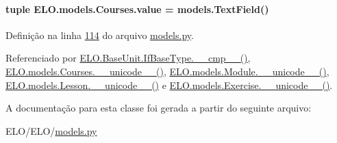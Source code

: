 \hypertarget{classELO_1_1models_1_1Courses_a2b3c228ef67c767570b3555b3b7f1de2}{}
\paragraph[{value}]{\setlength{\rightskip}{0pt plus 5cm}tuple E\+L\+O.\+models.\+Courses.\+value = models.\+Text\+Field()\hspace{0.3cm}{\ttfamily [static]}}\label{classELO_1_1models_1_1Courses_a2b3c228ef67c767570b3555b3b7f1de2}


Definição na linha \hyperlink{ELO_2models_8py_source_l00114}{114} do arquivo \hyperlink{ELO_2models_8py_source}{models.\+py}.



Referenciado por \hyperlink{classELO_1_1BaseUnit_1_1IfBaseType_a22d6f30c4d9504a9c20d0ff5a538544d}{E\+L\+O.\+Base\+Unit.\+If\+Base\+Type.\+\_\+\+\_\+cmp\+\_\+\+\_\+()}, \hyperlink{classELO_1_1models_1_1Courses_a8676cba71b99ab2ba60726b9b5e33825}{E\+L\+O.\+models.\+Courses.\+\_\+\+\_\+unicode\+\_\+\+\_\+()}, \hyperlink{classELO_1_1models_1_1Module_a8fc9fadf09fa7b3bbcfea69ebe25d278}{E\+L\+O.\+models.\+Module.\+\_\+\+\_\+unicode\+\_\+\+\_\+()}, \hyperlink{classELO_1_1models_1_1Lesson_a53e265de97c6b73f262f62a80f9ca994}{E\+L\+O.\+models.\+Lesson.\+\_\+\+\_\+unicode\+\_\+\+\_\+()} e \hyperlink{classELO_1_1models_1_1Exercise_a23f81c66e4d6bc5a4582d74d191f5117}{E\+L\+O.\+models.\+Exercise.\+\_\+\+\_\+unicode\+\_\+\+\_\+()}.



A documentação para esta classe foi gerada a partir do seguinte arquivo\+:\begin{DoxyCompactItemize}
\item 
E\+L\+O/\+E\+L\+O/\hyperlink{ELO_2models_8py}{models.\+py}\end{DoxyCompactItemize}
